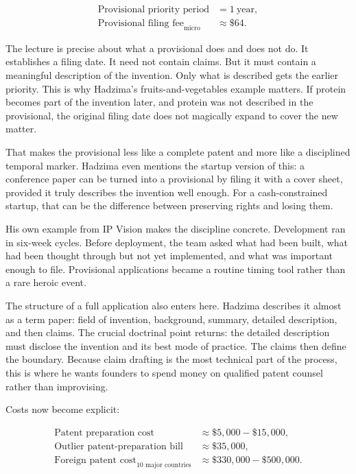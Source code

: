 \begin{align}
\text{Provisional priority period} &= 1\ \text{year},\\
\text{Provisional filing fee}_{\text{micro}} &\approx \$64.
\end{align}

The lecture is precise about what a provisional does and does not do. It establishes a filing date. It need not contain claims. But it must contain a meaningful description of the invention. Only what is described gets the earlier priority. This is why Hadzima's fruits-and-vegetables example matters. If protein becomes part of the invention later, and protein was not described in the provisional, the original filing date does not magically expand to cover the new matter.

That makes the provisional less like a complete patent and more like a disciplined temporal marker. Hadzima even mentions the startup version of this: a conference paper can be turned into a provisional by filing it with a cover sheet, provided it truly describes the invention well enough. For a cash-constrained startup, that can be the difference between preserving rights and losing them.

His own example from IP Vision makes the discipline concrete. Development ran in six-week cycles. Before deployment, the team asked what had been built, what had been thought through but not yet implemented, and what was important enough to file. Provisional applications became a routine timing tool rather than a rare heroic event.

The structure of a full application also enters here. Hadzima describes it almost as a term paper: field of invention, background, summary, detailed description, and then claims. The crucial doctrinal point returns: the detailed description must disclose the invention and its best mode of practice. The claims then define the boundary. Because claim drafting is the most technical part of the process, this is where he wants founders to spend money on qualified patent counsel rather than improvising.

Costs now become explicit:

\begin{align}
\text{Patent preparation cost} &\approx \$5{,}000-\$15{,}000,\\
\text{Outlier patent-preparation bill} &\approx \$35{,}000,\\
\text{Foreign patent cost}_{10\text{ major countries}} &\approx \$330{,}000-\$500{,}000.
\end{align}

